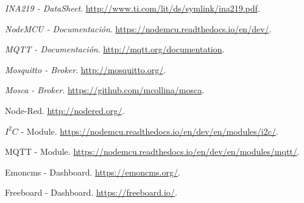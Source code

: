 \newpage
\thispagestyle{empty}
\mbox{}
\begin{thebibliography}{10}

{\em {INA219 - DataSheet}}.
\newblock \url{http://www.ti.com/lit/ds/symlink/ina219.pdf}.

{\em {NodeMCU - Documentación}}.
\newblock
  \url{https://nodemcu.readthedocs.io/en/dev/}.

{\em {MQTT - Documentación}}.
\newblock
  \url{http://mqtt.org/documentation}.

{\em {Mosquitto - Broker}}.
\newblock \url{http://mosquitto.org/}.

{\em {Mosca - Broker}}.
\newblock \url{https://github.com/mcollina/mosca}.

{Node-Red}.
\newblock \url{http://nodered.org/}.

{$I^2C$ - Module}.
\newblock \url{https://nodemcu.readthedocs.io/en/dev/en/modules/i2c/}.

{MQTT - Module}.
\newblock \url{https://nodemcu.readthedocs.io/en/dev/en/modules/mqtt/}.

{Emoncms - Dashboard}.
\newblock \url{https://emoncms.org/}.

{Freeboard - Dashboard}.
\newblock \url{https://freeboard.io/}.

\end{thebibliography}
